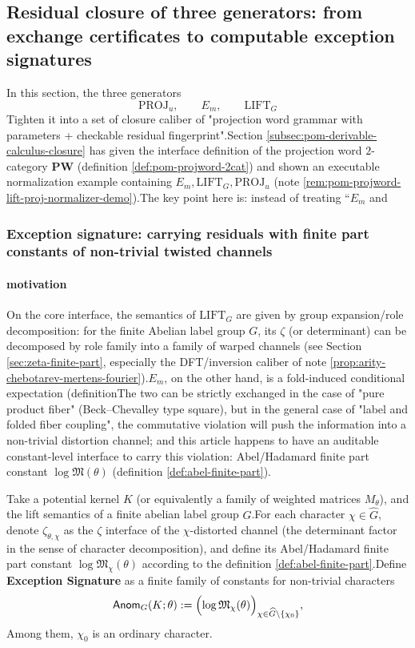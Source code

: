 \subsection{Residual closure of three generators: from exchange certificates to computable exception signatures}\label{subsec:pom-three-generator-residual-closure}
In this section, the three generators$$
\mathrm{PROJ}_u,\qquad E_m,\qquad \mathrm{LIFT}_G
$$
Tighten it into a set of closure caliber of "projection word grammar with parameters + checkable residual fingerprint".Section \ref{subsec:pom-derivable-calculus-closure} has given the interface definition of the projection word $2$-category $\mathbf{PW}$ (definition \ref{def:pom-projword-2cat}) and shown an executable normalization example containing \(E_m,\mathrm{LIFT}_G,\mathrm{PROJ}_u\) (note \ref{rem:pom-projword-lift-proj-normalizer-demo}).The key point here is: instead of treating “\(E_m\) and
\subsubsection{Exception signature: carrying residuals with finite part constants of non-trivial twisted channels}\label{subsec:pom-anom-signature}
\paragraph{motivation}On the core interface, the semantics of \(\mathrm{LIFT}_G\) are given by group expansion/role decomposition: for the finite Abelian label group \(G\), its \(\zeta\) (or determinant) can be decomposed by role family into a family of warped channels (see Section \ref{sec:zeta-finite-part}, especially the DFT/inversion caliber of note \ref{prop:arity-chebotarev-mertens-fourier}).\(E_m\), on the other hand, is a fold-induced conditional expectation (definitionThe two can be strictly exchanged in the case of "pure product fiber" (Beck--Chevalley type square), but in the general case of "label and folded fiber coupling", the commutative violation will push the information into a non-trivial distortion channel; and this article happens to have an auditable constant-level interface to carry this violation: Abel/Hadamard finite part constant \(\log\mathfrak{M}(\theta)\) (definition \ref{def:abel-finite-part}).
\begin{definition}\label{def:pom-anom-signature}Take a potential kernel \(K\) (or equivalently a family of weighted matrices \(M_\theta\)), and the lift semantics of a finite abelian label group \(G\).For each character \(\chi\in\widehat G\), denote \(\zeta_{\theta,\chi}\) as the \(\zeta\) interface of the \(\chi\)-distorted channel (the determinant factor in the sense of character decomposition), and define its Abel/Hadamard finite part constant \(\log\mathfrak{M}_\chi(\theta)\) according to the definition \ref{def:abel-finite-part}.Define \textbf{Exception Signature} as a finite family of constants for non-trivial characters$$
\mathsf{Anom}_{G}(K;\theta)
:=\Bigl(\log\mathfrak{M}_\chi(\theta)\Bigr)_{\chi\in\widehat G\setminus\{\chi_0\}},
$$
Among them, \(\chi_0\) is an ordinary character.\end{definition}

